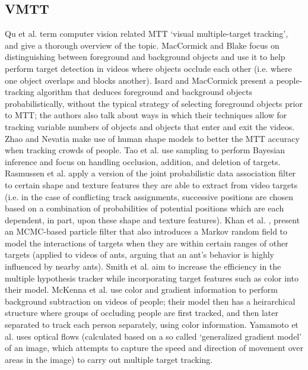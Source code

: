 \documentclass{article}
\begin{document}
\subsection*{VMTT}
\vspace{6pt}
Qu et al. \cite{qu_2007} term computer vision related MTT `visual multiple-target tracking', and give a thorough overview of the topic. MacCormick and Blake \cite{maccormick_1999} focus on distinguishing between foreground and background objects and use it to help perform target detection in videos where objects occlude each other (i.e. where one object overlaps and blocks another). Isard and MacCormick \cite{isard_2001} present a people-tracking algorithm that deduces foreground and background objects probabilistically, without the typical strategy of selecting foreground objects prior to MTT; the authors also talk about ways in which their techniques allow for tracking variable numbers of objects and objects that enter and exit the videos. Zhao and Nevatia \cite{tao_2004} make use of human shape models to better the MTT accuracy when tracking crowds of people. Tao et al. \cite{tao_1999} use sampling to perform Bayesian inference and focus on handling occlusion, addition, and deletion of targets. Rasmussen et al. \cite{rasmussen_2001} apply a version of the joint probabilistic data association filter to certain shape and texture features they are able to extract from video targets (i.e. in the case of conflicting track assignments, successive positions are chosen based on a combination of probabilities of potential positions which are each dependent, in part, upon these shape and texture features). Khan et al. \cite{khan_2005}, present an MCMC-based particle filter that also introduces a Markov random field to model the interactions of targets when they are within certain ranges of other targets (applied to videos of ants, arguing that an ant's behavior is highly influenced by nearby ants). Smith et al. \cite{smith_2005} aim to increase the efficiency in the multiple hypothesis tracker while incorporating target features such as color into their model. McKenna et al. \cite{mckenna_2000} use color and gradient information to perform background subtraction on videos of people; their model then has a heirarchical structure where groups of occluding people are first tracked, and then later separated to track each person separately, using color information. Yamamoto et al. \cite{yamamoto_1995} uses optical flows (calculated based on a so called `generalized gradient model' of an image, which attempts to capture the speed and direction of movement over areas in the image) to carry out multiple target tracking.\\
\end{document}
